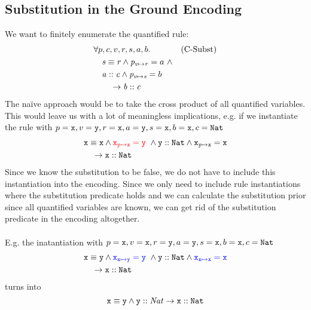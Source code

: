 \documentclass[a4paper]{article}
\begin{document}
\newpage
\subsection{Substitution in the Ground Encoding}
We want to finitely enumerate the quantified rule:
\begin{align*}
  &\forall p, c, v, r, s, a, b. && \text{(C-Subst)}\\
  &\quad \mathit{s} \equiv \mathit{r} \land \mathit{p}_{\mathit{v} \mapsto \mathit{r}}=a~\land\\
  &\quad \mathit{a} :: \mathit{c} \land
         \mathit{p}_{\mathit{v} \mapsto \mathit{s}}=b\\
  &\qquad \rightarrow \mathit{b} :: \mathit{c}
\end{align*}
The na\"ive approach would be to take the cross product of all quantified variables.
This would leave us with a lot of meaningless implications,
e.g. if we instantiate the rule with
$p=\mathtt{x}, v=\mathtt{y}, r=\mathtt{x}, a=\mathtt{y}, s=\mathtt{x}, b=\mathtt{x}, c=\mathtt{Nat}$
\begin{align*}
  &\mathit{\mathtt{x}} \equiv \mathit{\mathtt{x}} \land {\color{red}\ensuremath{\mathit{\mathtt{x}}_{\mathit{\mathtt{y}} \mapsto \mathit{\mathtt{x}}}}=\mathtt{y}}~\land
  \mathit{\mathtt{y}} :: \mathit{\mathtt{Nat}} \land \mathit{\mathtt{x}}_{\mathit{\mathtt{y}} \mapsto \mathit{\mathtt{x}}}=\mathtt{x}\\
  &\quad \rightarrow \mathit{\mathtt{x}} :: \mathit{\mathtt{Nat}}
\end{align*}
Since we know the substitution to be false,
we do not have to include this instantiation into the encoding.
Since we only need to include rule instantiations where the substitution
predicate holds and we can calculate the substitution prior
since all quantified variables are known,
we can get rid of the substitution predicate in the encoding altogether.\\
\\
E.g. the inatantiation with
$p=\mathtt{x}, v=\mathtt{x}, r=\mathtt{y}, a=\mathtt{y}, s=\mathtt{x}, b=\mathtt{x}, c=\mathtt{Nat}$
\begin{align*}
  &\mathit{\mathtt{x}} \equiv \mathit{\mathtt{y}} \land
   {\color{blue}\ensuremath{\mathit{\mathtt{x}}_{\mathit{\mathtt{x}} \mapsto \mathit{\mathtt{y}}}}=\mathtt{y}}~\land
   \mathit{\mathtt{y}} :: \mathit{\mathtt{Nat}} \land
   {\color{blue}\ensuremath{\mathit{\mathtt{x}}_{\mathit{\mathtt{x}} \mapsto \mathit{\mathtt{x}}}}=\mathtt{x}}\\
  &\quad \rightarrow \mathit{\mathtt{x}} :: \mathit{\mathtt{Nat}}
\end{align*}
turns into
\[
  \mathit{\mathtt{x}} \equiv \mathit{\mathtt{y}} \land \mathit{\mathtt{y}} :: \mathit{Nat} \rightarrow \mathit{\mathtt{x}} :: \mathit{\mathtt{Nat}}
\]

%
\end{document}
